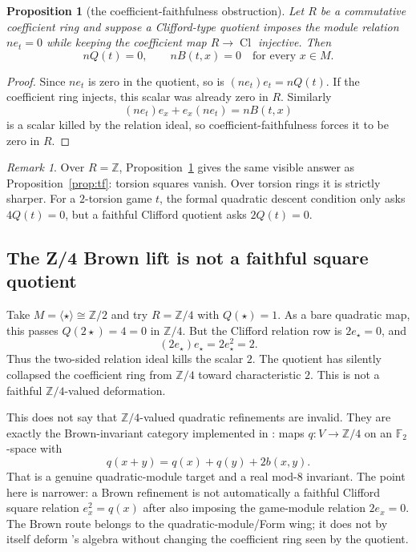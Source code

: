 \documentclass[11pt]{article}
\newtheorem{proposition}[theorem]{Proposition}
\theoremstyle{remark}
\newtheorem{remark}[theorem]{Remark}
\newcommand{\Z}{\mathbb{Z}}
\newcommand{\F}{\mathbb{F}}
\newcommand{\Cl}{\operatorname{Cl}}
\begin{document}
\begin{proposition}[the coefficient-faithfulness obstruction]\label{prop:faith}
Let $R$ be a commutative coefficient ring and suppose a
Clifford-type quotient imposes the module relation $ne_t=0$ while keeping the
coefficient map $R\to\Cl$ injective.  Then
\[
  nQ(t)=0,\qquad nB(t,x)=0\quad\text{for every }x\in M.
\]
\end{proposition}

\begin{proof}
Since $ne_t$ is zero in the quotient, so is $(ne_t)e_t=nQ(t)$.  If the
coefficient ring injects, this scalar was already zero in $R$.  Similarly
\[
  (ne_t)e_x+e_x(ne_t)=nB(t,x)
\]
is a scalar killed by the relation ideal, so coefficient-faithfulness forces
it to be zero in $R$.
\end{proof}

\begin{remark}
Over $R=\Z$, Proposition~\ref{prop:faith} gives the same visible answer as
Proposition~\ref{prop:tf}: torsion squares vanish.  Over torsion rings it is
strictly sharper.  For a $2$-torsion game $t$, the formal quadratic descent
condition only asks $4Q(t)=0$, but a faithful Clifford quotient asks
$2Q(t)=0$.
\end{remark}

\subsection{The Z/4 Brown lift is not a faithful square quotient}

Take $M=\langle\star\rangle\cong\Z/2$ and try $R=\Z/4$ with $Q(\star)=1$.
As a bare quadratic map, this passes $Q(2\star)=4=0$ in $\Z/4$.  But the
Clifford relation row is $2e_\star=0$, and
\[
  (2e_\star)e_\star=2e_\star^2=2.
\]
Thus the two-sided relation ideal kills the scalar $2$.  The quotient has
silently collapsed the coefficient ring from $\Z/4$ toward characteristic
$2$.  This is not a faithful $\Z/4$-valued deformation.

This does not say that $\Z/4$-valued quadratic refinements are
invalid.  They are exactly the Brown-invariant category implemented in
: maps $q\colon V\to\Z/4$ on an $\F_2$-space
with
\[
  q(x+y)=q(x)+q(y)+2b(x,y).
\]
That is a genuine quadratic-module target and a real mod-$8$ invariant.  The
point here is narrower: a Brown refinement is not automatically a faithful
Clifford square relation $e_x^2=q(x)$ after also imposing the game-module
relation $2e_x=0$.  The Brown route belongs to the quadratic-module/Form wing;
it does not by itself deform 's algebra without changing the
coefficient ring seen by the quotient.
\end{document}
